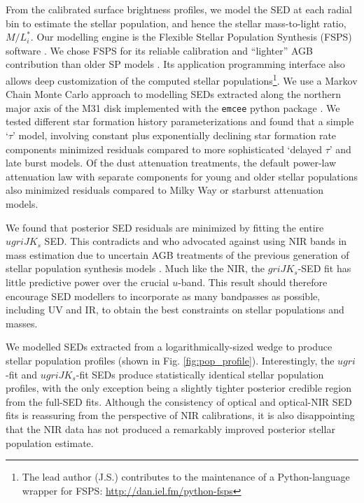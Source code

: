 \documentclass{iau}
\begin{document}
From the calibrated surface brightness profiles, we model the SED at each radial bin to estimate the stellar population, and hence the stellar mass-to-light ratio, $M/L_i^*$.
Our modelling engine is the Flexible Stellar Population Synthesis (FSPS) software \citep{Conroy:2009,Conroy:2010}.
We chose FSPS for its reliable calibration and ``lighter'' AGB contribution than older SP models \citep[e.g.,][]{Bruzual:2003}.
Its application programming interface also allows deep customization of the computed stellar populations\footnote{The lead author (J.S.) contributes to the maintenance of a Python-language wrapper for FSPS: \url{http://dan.iel.fm/python-fsps}}.
We use a Markov Chain Monte Carlo approach to modelling SEDs extracted along the northern major axis of the M31 disk implemented with the \texttt{emcee} python package \citep{Foreman-Mackey:2013}.
We tested different star formation history parameterizations and found that a simple `$\tau$' model, involving constant plus exponentially declining star formation rate components minimized residuals compared to more sophisticated `delayed $\tau$' and late burst models.
Of the dust attenuation treatments, the default power-law attenuation law with separate components for young and older stellar populations also minimized residuals compared to Milky Way or starburst attenuation models.

We found that posterior SED residuals are minimized by fitting the entire $ugriJK_s$ SED.
This contradicts \cite{Taylor:2011} and \cite{Zibetti:2009} who advocated against using NIR bands in mass estimation due to uncertain AGB treatments of the previous generation of stellar population synthesis models \citep[e.g.][]{Bruzual:2003,Maraston:2005}.
Much like the NIR, the $griJK_s$-SED fit has little predictive power over the crucial $u$-band.
This result should therefore encourage SED modellers to incorporate as many bandpasses as possible, including UV and IR, to obtain the best constraints on stellar populations and masses.

We modelled SEDs extracted from a logarithmically-sized wedge \citep[e.g.][their Fig. 2]{Courteau:2011} to produce stellar population profiles (shown in Fig. \ref{fig:pop_profile}).
Interestingly, the $ugri$-fit and $ugriJK_s$-fit SEDs produce statistically identical stellar population profiles, with the only exception being a slightly tighter posterior credible region from the full-SED fits.
Although the consistency of optical and optical-NIR SED fits is reassuring from the perspective of NIR calibrations, it is also disappointing that the NIR data has not produced a remarkably improved posterior stellar population estimate.
\end{document}
